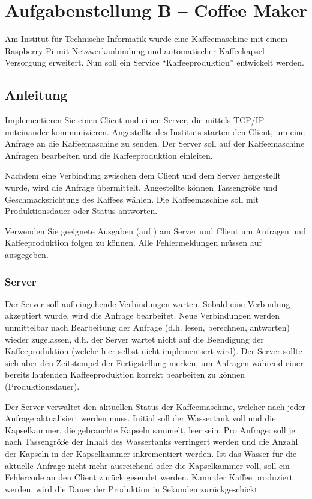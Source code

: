 



\section*{Aufgabenstellung B -- Coffee Maker}\label{sec:aufgabenstellung}

Am Institut für Technische Informatik wurde eine Kaffeemaschine mit einem
Raspberry Pi mit Netzwerkanbindung und automatischer Kaffeekapsel-Versorgung
erweitert. Nun soll ein Service ``Kaffeeproduktion'' entwickelt werden.

\subsection*{Anleitung}
Implementieren Sie einen Client und einen Server, die mittels TCP/IP
miteinander kommunizieren. Angestellte des Instituts starten den Client, um
eine Anfrage an die Kaffeemaschine zu senden. Der Server soll auf der
Kaffeemaschine Anfragen bearbeiten und die Kaffeeproduktion einleiten.

Nachdem eine Verbindung zwischen dem Client und dem Server hergestellt wurde,
wird die Anfrage übermittelt. Angestellte können Tassengröße und
Geschmacksrichtung des Kaffees wählen. Die Kaffeemaschine soll mit
Produktionsdauer oder Status antworten.

Verwenden Sie geeignete Ausgaben (auf ) am Server und Client
um Anfragen und Kaffeeproduktion folgen zu können. Alle Fehlermeldungen müssen
auf  ausgegeben.

\subsubsection*{Server}
Der Server soll auf eingehende Verbindungen warten. Sobald eine Verbindung
akzeptiert wurde, wird die Anfrage bearbeitet. Neue Verbindungen werden
unmittelbar nach Bearbeitung der Anfrage (d.h. lesen, berechnen, antworten)
wieder zugelassen, d.h. der Server wartet nicht auf die Beendigung der
Kaffeeproduktion (welche hier selbst nicht implementiert wird). Der Server
sollte sich aber den Zeitstempel der Fertigstellung merken, um Anfragen während
einer bereits laufenden Kaffeeproduktion korrekt bearbeiten zu können
(Produktionsdauer).

Der Server verwaltet den aktuellen Status der Kaffeemaschine, welcher nach
jeder Anfrage aktualisiert werden muss. Initial soll der Wassertank voll und
die Kapselkammer, die gebrauchte Kapseln sammelt, leer sein. Pro Anfrage: soll
je nach Tassengröße der Inhalt des Wassertanks verringert werden und die Anzahl
der Kapseln in der Kapselkammer inkrementiert werden. Ist das Wasser für die
aktuelle Anfrage nicht mehr ausreichend oder die Kapselkammer voll, soll ein
Fehlercode an den Client zurück gesendet werden. Kann der Kaffee produziert
werden, wird die Dauer der Produktion in Sekunden zurückgeschickt.

